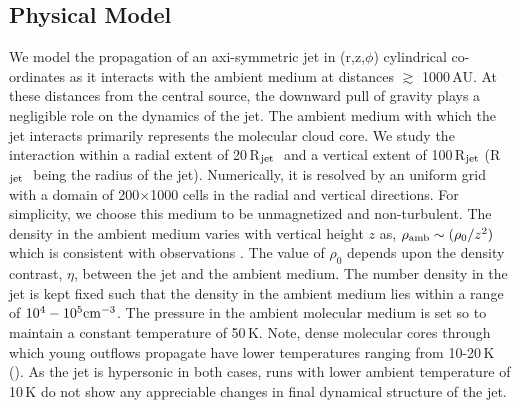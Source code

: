 \documentclass[useAMS,usenatbib]{mn2e}
\newcommand{\rj}{R$_{\rm jet}$}
\begin{document}
\subsection{Physical Model}
We model the propagation of an axi-symmetric jet
in (r,z,$\phi$) cylindrical co-ordinates as it interacts with the
ambient medium at distances $\gtrsim$ 1000\,AU. 
At these distances from the central source, the downward pull of gravity plays a
negligible role on the dynamics of the jet. The ambient medium with which the jet interacts primarily
represents the molecular cloud core. We study the interaction within a
radial extent of 20\,\rj\,\, and a vertical extent of 100\,\rj\,\,(\rj\,\, being the radius of
the jet). Numerically, it is resolved by an uniform grid with a domain
of 200$\times$1000 cells in the radial and vertical directions. For simplicity, we choose this medium
to be unmagnetized and non-turbulent. The density in the ambient
medium varies with vertical height $z$ as, $\rho_{\rm amb}\sim (\rho_0/z^{2})$
which is consistent with observations \citep{Keto:2010p15549,
  Caselli:2011p13935}. The value of
$\rho_0$ depends upon the density contrast, $\eta$, between the jet and
the ambient medium. The number density in the jet is kept fixed such
that the density in the ambient medium lies within a range of $10^{4}-10^{5}
\rm cm^{-3}$. The pressure in the ambient molecular medium is
set so to maintain a constant temperature of 50\,K. Note, dense
molecular cores through which young outflows propagate
have lower temperatures ranging from 10-20\,K
(\citealt{Rathborne:2007p15753}). As the jet is hypersonic in both
cases, runs with lower ambient temperature of 10\,K do not show any 
appreciable changes in final dynamical structure of the jet.

%
\end{document}
